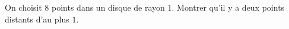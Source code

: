 On choisit $8$ points dans un disque de rayon $1$. Montrer qu'il y a deux
points distants d'au plus $1$.
